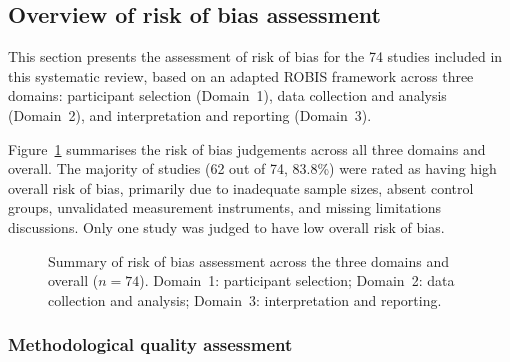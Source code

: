 \documentclass[a4paper,fleqn]{cas-sc}
\begin{document}
\subsection{Overview of risk of bias assessment}

This section presents the assessment of risk of bias for the 74 studies included in this systematic review, based on an adapted ROBIS framework across three domains: participant selection (Domain~1), data collection and analysis (Domain~2), and interpretation and reporting (Domain~3).

Figure~\ref{fig:rob_summary} summarises the risk of bias judgements across all three domains and overall. The majority of studies (62 out of 74, 83.8\%) were rated as having high overall risk of bias, primarily due to inadequate sample sizes, absent control groups, unvalidated measurement instruments, and missing limitations discussions. Only one study was judged to have low overall risk of bias.

\begin{figure}[ht!]
\centering
{}
\caption{Summary of risk of bias assessment across the three domains and overall ($n=74$). Domain~1: participant selection; Domain~2: data collection and analysis; Domain~3: interpretation and reporting.}
\label{fig:rob_summary}
\end{figure}

\subsubsection{Methodological quality assessment}
\end{document}
